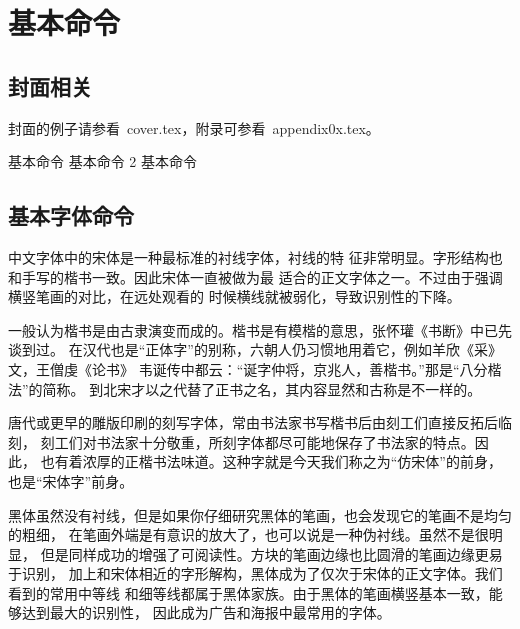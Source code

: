 

\chapter{基本命令}
\label{cha:command}


\section{封面相关}
\label{sec:cover}

封面的例子请参看~cover.tex，附录可参看~appendix0x.tex。

{ 基本命令}
{ 基本命令}
2 基本命令

\section{基本字体命令}
\label{sec:font}

中文字体中的宋体是一种最标准的衬线字体，衬线的特
征非常明显。字形结构也和手写的楷书一致。因此宋体一直被做为最
适合的正文字体之一。不过由于强调横竖笔画的对比，在远处观看的
时候横线就被弱化，导致识别性的下降。

{\kai
一般认为楷书是由古隶演变而成的。楷书是有模楷的意思，张怀瓘《书断》中已先谈到过。
在汉代也是“正体字”的别称，六朝人仍习惯地用着它，例如羊欣《采》文，王僧虔《论书》
韦诞传中都云：“诞字仲将，京兆人，善楷书。”那是“八分楷法”的简称。
到北宋才以之代替了正书之名，其内容显然和古称是不一样的。}

{\fs
唐代或更早的雕版印刷的刻写字体，常由书法家书写楷书后由刻工们直接反拓后临刻，
刻工们对书法家十分敬重，所刻字体都尽可能地保存了书法家的特点。因此，
也有着浓厚的正楷书法味道。这种字就是今天我们称之为“仿宋体”的前身，
也是“宋体字”前身。}


{\hei
黑体虽然没有衬线，但是如果你仔细研究黑体的笔画，也会发现它的笔画不是均匀的粗细，
在笔画外端是有意识的放大了，也可以说是一种伪衬线。虽然不是很明显，
但是同样成功的增强了可阅读性。方块的笔画边缘也比圆滑的笔画边缘更易于识别，
加上和宋体相近的字形解构，黑体成为了仅次于宋体的正文字体。我们看到的常用中等线
和细等线都属于黑体家族。由于黑体的笔画横竖基本一致，能够达到最大的识别性，
因此成为广告和海报中最常用的字体。}

